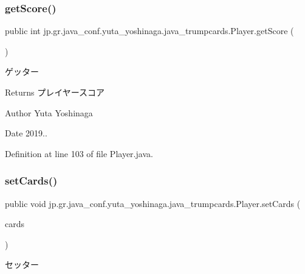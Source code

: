 \subsubsection{\texorpdfstring{get\+Score()}{getScore()}}
{\footnotesize\ttfamily public int jp.\+gr.\+java\+\_\+conf.\+yuta\+\_\+yoshinaga.\+java\+\_\+trumpcards.\+Player.\+get\+Score (\begin{DoxyParamCaption}{ }\end{DoxyParamCaption})}



ゲッター 

\begin{DoxyReturn}{Returns}
プレイヤースコア 
\end{DoxyReturn}
\begin{DoxyAuthor}{Author}
Yuta Yoshinaga 
\end{DoxyAuthor}
\begin{DoxyDate}{Date}
2019.. 
\end{DoxyDate}


Definition at line 103 of file Player.\+java.

\mbox{\label{classjp_1_1gr_1_1java__conf_1_1yuta__yoshinaga_1_1java__trumpcards_1_1_player_af3a6a421101b6e8ba60e9578a1b9ec74}} 
\subsubsection{\texorpdfstring{set\+Cards()}{setCards()}}
{\footnotesize\ttfamily public void jp.\+gr.\+java\+\_\+conf.\+yuta\+\_\+yoshinaga.\+java\+\_\+trumpcards.\+Player.\+set\+Cards (\begin{DoxyParamCaption}\item[{Array\+List$<$ \hyperlink{classjp_1_1gr_1_1java__conf_1_1yuta__yoshinaga_1_1java__trumpcards_1_1_card}{Card} $>$}]{cards }\end{DoxyParamCaption})}



セッター 


